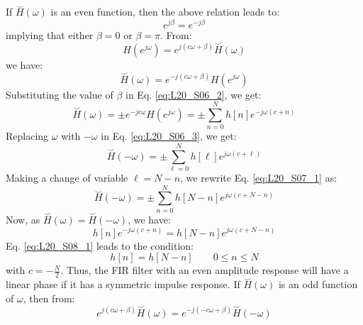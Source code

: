 \documentclass[../../main/main.tex]{subfiles}
\begin{document}
If \( \overset{\smallsmile}{H}(\omega) \) is an even function, then the above relation leads to:
\begin{equation}
    e^{j\beta}
    =
    e^{-j\beta}
    \label{eq:L20_S05_3}
\end{equation}
implying that either \( \beta = 0 \) or \( \beta = \pi \). From:
\begin{equation}
    H(e^{j\omega})
    =
    e^{j(c\omega + \beta)} \overset{\smallsmile}{H}(\omega)
    \label{eq:L20_S06_1}
\end{equation}
we have:
\begin{equation}
    \overset{\smallsmile}{H}(\omega)
    =
    e^{-j(c\omega + \beta)} H(e^{j\omega})
    \label{eq:L20_S06_2}
\end{equation}
Substituting the value of \( \beta \) in Eq. \ref{eq:L20_S06_2}, we get:
\begin{equation}
    \overset{\smallsmile}{H}(\omega)
    =
    \pm e^{-jc\omega} H(e^{j\omega})
    =
    \pm \sum_{n=0}^{N} h[n] e^{-j\omega (c + n)}
    \label{eq:L20_S06_3}
\end{equation}
Replacing \( \omega \) with \( - \omega \) in Eq. \ref{eq:L20_S06_3}, we get:
\begin{equation}
    \overset{\smallsmile}{H}(-\omega)
    =
    \pm \sum_{\ell = 0}^{N} h[\ell] e^{j\omega (c + \ell)}
    \label{eq:L20_S07_1}
\end{equation}
Making a change of variable \( \ell = N - n \), we rewrite Eq. \ref{eq:L20_S07_1} as:
\begin{equation}
    \overset{\smallsmile}{H}(-\omega)
    =
    \pm \sum_{n=0}^{N} h[N-n] e^{j\omega (c + N - n)}
    \label{eq:L20_S07_2}
\end{equation}
Now, as \( \overset{\smallsmile}{H}(\omega) = \overset{\smallsmile}{H}(-\omega) \), we have:
\begin{equation}
    h[n] e^{-j\omega (c+n)}
    =
    h[N-n] e^{j\omega (c+N-n)}
    \label{eq:L20_S08_1}
\end{equation}
Eq. \ref{eq:L20_S08_1} leads to the condition:
\begin{equation}
    h[n]
    =
    h[N-n]
    \qquad
    0 \le n \le N
    \label{eq:L20_S08_2}
\end{equation}
with \( c = - \frac{N}{2} \). Thus, the FIR filter with an even amplitude response will have a linear phase if it has a symmetric impulse response. If \( \overset{\smallsmile}{H}(\omega) \) is an odd function of \( \omega \), then from:
\begin{equation}
    e^{j(c\omega + \beta)} \overset{\smallsmile}{H}(\omega)
    =
    e^{-j(-c\omega + \beta)} \overset{\smallsmile}{H}(-\omega)
    \label{eq:L20_S09_1}
\end{equation}
\end{document}
